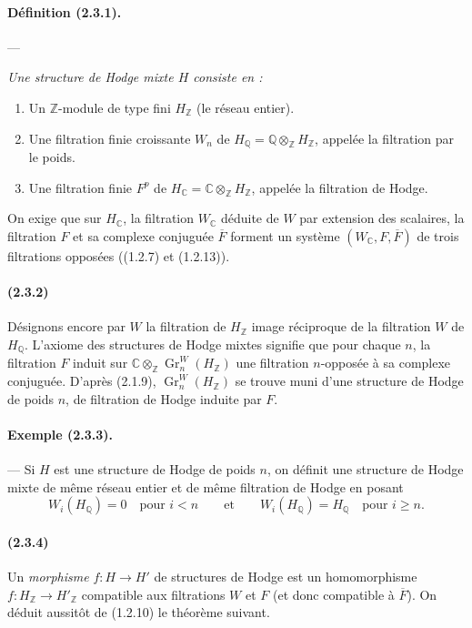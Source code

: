 \documentclass[10pt]{article}
\newcommand{\C}{\mathbb C}
\newcommand{\Q}{\mathbb Q}
\newcommand{\Z}{\mathbb Z}
\newcommand{\Gr}{\operatorname{Gr}}
\newcommand{\fg}{\guillemotright}
\newcommand{\og}{\guillemotleft}
\begin{document}
\paragraph{Définition (2.3.1).} --- {\itshape Une structure de Hodge mixte $H$ consiste en :
\begin{enumerate}[label=\alph*)]
\item Un $\Z$-module de type fini $H_\Z$ (le \og réseau entier\fg{}).
\item Une filtration finie croissante $W_n$ de $H_\Q=\Q\otimes_\Z H_\Z$, appelée la filtration par le poids.
\item Une filtration finie $F^p$ de $H_\C=\C\otimes_\Z H_\Z$, appelée la filtration de Hodge.
\end{enumerate}
On exige que sur $H_\C$, la filtration $W_\C$ déduite de $W$ par extension des scalaires, la filtration $F$ et sa complexe conjuguée $\overline F$ forment un système $(W_\C,F,\overline F)$ de trois filtrations opposées ((1.2.7) et (1.2.13)).}

\paragraph{(2.3.2)} Désignons encore par $W$ la filtration de $H_\Z$ image réciproque de la filtration $W$ de $H_\Q$. L'axiome des structures de Hodge mixtes signifie que pour chaque $n$, la filtration $F$ induit sur $\C\otimes_\Z\Gr_n^W(H_\Z)$ une filtration $n$-opposée à sa complexe conjuguée. D'après (2.1.9), $\Gr_n^W(H_\Z)$ se trouve muni d'une structure de Hodge de poids $n$, de filtration de Hodge induite par $F$.

\paragraph{Exemple (2.3.3).} --- Si $H$ est une structure de Hodge de poids $n$, on définit une structure de Hodge mixte de même réseau entier et de même filtration de Hodge en posant
\[
W_i(H_\Q)=0\quad\text{pour } i<n\qquad\text{et}\qquad
W_i(H_\Q)=H_\Q\quad\text{pour } i\ge n.
\]

\paragraph{(2.3.4)} Un \emph{morphisme} $f:H\to H'$ de structures de Hodge est un homomorphisme $f:H_\Z\to H'_\Z$ compatible aux filtrations $W$ et $F$ (et donc compatible à $\overline F$). On déduit aussitôt de (1.2.10) le théorème suivant.
\end{document}
